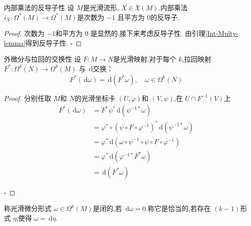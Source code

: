 \documentclass[../../几何与拓扑.tex]{subfiles}
\begin{document}
\begin{proposition}{内部乘法的反导子性}
    设 $ M $是光滑流形, $ X \in \mathfrak{X}\left( M \right)  $.内部乘法 $ i_{X}:  \Omega^{*}\left( M \right)\to  \Omega ^{*}\left( M \right)   $是次数为 $ -1 $  且平方为 $ 0 $的反导子. 
\end{proposition}
\begin{proof}
    次数为 $ -1 $和平方为 $ 0 $ 是显然的,接下来考虑反导子性.
    由引理\ref{Int-Multy-lemma}得到反导子性.
    \hfill $\square$
\end{proof}

\begin{proposition}{外微分与拉回的交换性}
设 $ F:M\to N $是光滑映射,对于每个 $ k $,拉回映射 $ F^{*}:  \Omega ^{k}\left( N \right)\to  \Omega ^{k}\left( M \right)   $   与 $ \,\mathrm{d}  $交换：$$
F^{*}\left( \,\mathrm{d}  \omega  \right) = \,\mathrm{d} \left( F^{*} \omega  \right),\quad      \omega  \in  \Omega ^{k}\left( N \right)  
$$ 
\end{proposition}

\begin{proof}
    分别任取 $ M $和 $ N $的光滑坐标卡 $ \left( U,\varphi  \right)  $和 $ \left( V,\psi  \right)  $,在 $ U\cap F^{-1} \left( V \right)  $上
    $$
    \begin{aligned}
    F^{*}\left(\,\mathrm{d}  \omega  \right)& = F^{*}\psi ^{*} \,\mathrm{d} \left( \psi ^{-1*} \omega  \right)   \\ 
     & = \varphi ^{*}\circ \left( \psi \circ F\circ \varphi ^{-1}  \right)^{*} \,\mathrm{d} \left( \psi ^{-1*} \omega  \right)  \\ 
      & = \varphi ^{*} \,\mathrm{d} \left(  \omega \circ \psi ^{-1} \circ \psi \circ F\circ \varphi ^{-1}  \right) \\ 
       & = \varphi ^{*}\,\mathrm{d} \left( \varphi ^{-1*}F^{*} \omega  \right)\\ 
        & = \,\mathrm{d} \left( F^{*} \omega  \right)  
    \end{aligned}
    $$     

    \hfill $\square$
\end{proof}

\begin{definition}
    称光滑微分形式 $  \omega  \in  \Omega ^{k}\left( M \right)  $是闭的,若 $ \,\mathrm{d}  \omega =0 $.称它是恰当的,若存在 $ \left( k-1 \right)  $形式 $ \eta  $,使得 $  \omega  = \,\mathrm{d} \eta  $.            
\end{definition}
\end{document}
